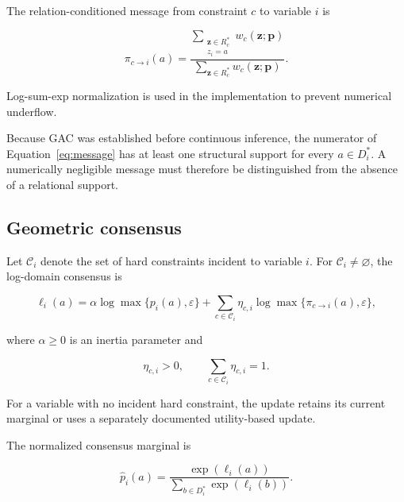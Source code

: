 \documentclass[pdflatex,sn-mathphys-num,iicol,oneside]{sn-jnl}
\begin{document}
The relation-conditioned message from constraint $c$ to variable $i$
is

\begin{equation}
\pi_{c\rightarrow i}(a)
=
\frac{
\displaystyle
\sum_{\substack{\bm{z}\in R_c^{*}\\z_i=a}}
w_c(\bm{z};\bm{p})
}{
\displaystyle
\sum_{\bm{z}\in R_c^{*}}
w_c(\bm{z};\bm{p})
}.
\label{eq:message}
\end{equation}

Log-sum-exp normalization is used in the implementation to prevent
numerical underflow.

Because GAC was established before continuous inference, the
numerator of Equation~\eqref{eq:message} has at least one structural
support for every $a\in D_i^{*}$. A numerically negligible message
must therefore be distinguished from the absence of a relational
support.

\subsection{Geometric consensus}

Let $\mathcal{C}_i$ denote the set of hard constraints incident to
variable $i$. For $\mathcal{C}_i\neq\varnothing$, the log-domain
consensus is

\begin{equation}
\ell_i(a)
=
\alpha
\log\max\{p_i(a),\varepsilon\}
+
\sum_{c\in\mathcal{C}_i}
\eta_{c,i}
\log\max\{
\pi_{c\rightarrow i}(a),\varepsilon
\},
\label{eq:consensus}
\end{equation}

where $\alpha\geq 0$ is an inertia parameter and

\begin{equation}
\eta_{c,i}>0,
\qquad
\sum_{c\in\mathcal{C}_i}\eta_{c,i}=1.
\end{equation}

For a variable with no incident hard constraint, the update retains
its current marginal or uses a separately documented utility-based
update.

The normalized consensus marginal is

\begin{equation}
\widehat{p}_i(a)
=
\frac{\exp(\ell_i(a))}
{\displaystyle
\sum_{b\in D_i^{*}}
\exp(\ell_i(b))}.
\end{equation}
\end{document}

